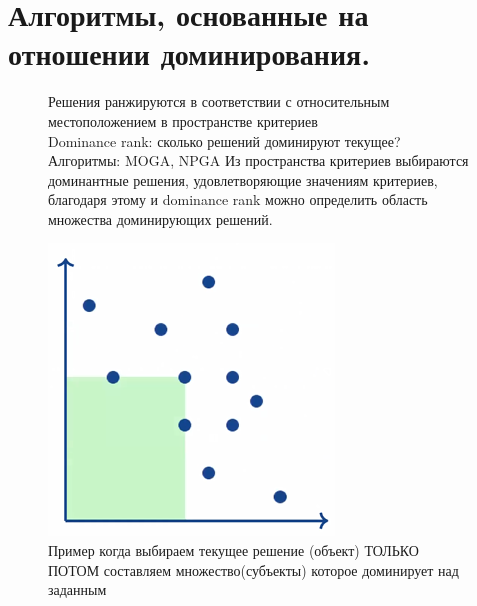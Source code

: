 \section{Алгоритмы, основанные на отношении доминирования.}
\begin{figure}[h]
Решения ранжируются в соответствии с относительным местоположением в
пространстве критериев\\
Dominance rank: сколько решений доминируют текущее?\\
Алгоритмы: MOGA, NPGA
Из пространства критериев выбираются доминантные решения, удовлетворяющие  значениям критериев, благодаря этому и dominance rank можно определить область множества доминирующих решений.
\begin{center}
    \includegraphics[width=0.8\linewidth]{images/Dominate_1.PNG}
    \caption{Пример когда выбираем текущее решение (объект) ТОЛЬКО ПОТОМ составляем множество(субъекты) которое доминирует над заданным}
    \label{fig:mpr}
\end{center}
\end{figure}

